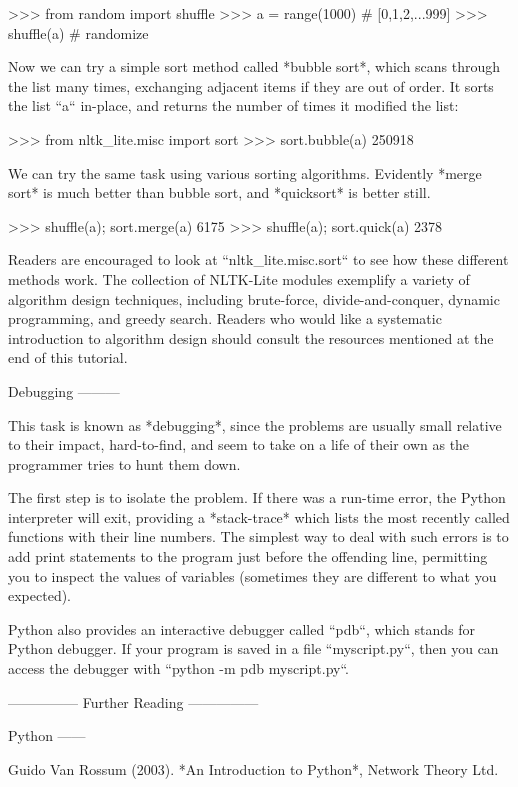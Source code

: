 \documentclass[presentation]{beamer}
\begin{document}
  >>> from random import shuffle
  >>> a = range(1000)                     # [0,1,2,...999]
  >>> shuffle(a)                          # randomize

Now we can try a simple sort method called *bubble sort*, which
scans through the list many times, exchanging adjacent items if
they are out of order.  It sorts the list ``a`` in-place, and returns
the number of times it modified the list:

  >>> from nltk_lite.misc import sort
  >>> sort.bubble(a)
  250918

We can try the same task using various sorting algorithms.  Evidently
*merge sort* is much better than bubble sort, and *quicksort* is better still.

  >>> shuffle(a); sort.merge(a)
  6175
  >>> shuffle(a); sort.quick(a)
  2378

Readers are encouraged to look at ``nltk_lite.misc.sort`` to see how
these different methods work.  The collection of NLTK-Lite modules
exemplify a variety of algorithm design techniques, including
brute-force, divide-and-conquer, dynamic programming, and greedy search.
Readers who would like a systematic introduction to algorithm design
should consult the resources mentioned at the end of this tutorial.

Debugging
---------

This task is known as *debugging*, since the problems are usually
small relative to their impact, hard-to-find, and seem to take on a
life of their own as the programmer tries to hunt them down.

The first step is to isolate the problem.  If there was a run-time
error, the Python interpreter will exit, providing a *stack-trace*
which lists the most recently called functions with their line numbers.
The simplest way to deal with such errors is to add print statements
to the program just before the offending line, permitting you to inspect
the values of variables (sometimes they are different to what you expected).

Python also provides an interactive debugger called ``pdb``, which stands
for Python debugger.  If your program is saved in a file ``myscript.py``,
then you can access the debugger with ``python -m pdb myscript.py``.

---------------
Further Reading
---------------

Python
------

Guido Van Rossum (2003).
*An Introduction to Python*,
Network Theory Ltd.
\end{document}
